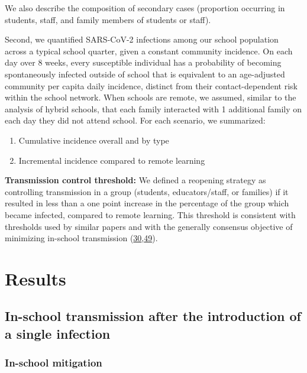 \documentclass[
]{article}
\providecommand{\tightlist}{%
  \setlength{\itemsep}{0pt}\setlength{\parskip}{0pt}}
\begin{document}
We also describe the composition of secondary cases (proportion
occurring in students, staff, and family members of students or staff).

Second, we quantified SARS-CoV-2 infections among our school population
across a typical school quarter, given a constant community incidence.
On each day over 8 weeks, every susceptible individual has a probability
of becoming spontaneously infected outside of school that is equivalent
to an age-adjusted community per capita daily incidence, distinct from
their contact-dependent risk within the school network. When schools are
remote, we assumed, similar to the analysis of hybrid schools, that each
family interacted with 1 additional family on each day they did not
attend school. For each scenario, we summarized:

\begin{enumerate}
\def\labelenumi{\arabic{enumi}.}
\tightlist
\item
  Cumulative incidence overall and by type
\item
  Incremental incidence compared to remote learning
\end{enumerate}

\textbf{Transmission control threshold:} We defined a reopening strategy
as controlling transmission in a group (students, educators/staff, or
families) if it resulted in less than a one point increase in the
percentage of the group which became infected, compared to remote
learning. This threshold is consistent with thresholds used by similar
papers and with the generally consensus objective of minimizing
in-school transmission
(\protect\hyperlink{ref-head_effect_2020}{30},\protect\hyperlink{ref-noauthor_schools_nodate}{49}).

\hypertarget{results}{%
\section{Results}\label{results}}

\hypertarget{in-school-transmission-after-the-introduction-of-a-single-infection}{%
\subsection{In-school transmission after the introduction of a single
infection}\label{in-school-transmission-after-the-introduction-of-a-single-infection}}

\hypertarget{in-school-mitigation}{%
\subsubsection{In-school mitigation}\label{in-school-mitigation}}
\end{document}
